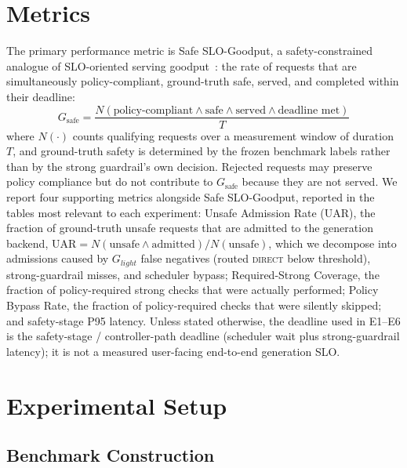 \documentclass[conference]{IEEEtran}
\newcommand{\Glight}{G_{\mathit{light}}}
\newcommand{\Gsafe}{G_{\mathrm{safe}}}
\newcommand{\DIRECT}{\textsc{direct}}
\begin{document}
\section{Metrics}
\label{sec:metrics}

The primary performance metric is Safe SLO-Goodput, a safety-constrained analogue of SLO-oriented serving goodput~\cite{zhong2024distserve}: the rate of requests that are simultaneously policy-compliant, ground-truth safe, served, and completed within their deadline:
\begin{equation}
\Gsafe = \frac{N(\text{policy-compliant} \!\wedge\! \text{safe} \!\wedge\! \text{served} \!\wedge\! \text{deadline met})}{T}
\end{equation}
where $N(\cdot)$ counts qualifying requests over a measurement window of duration $T$, and ground-truth safety is determined by the frozen benchmark labels rather than by the strong guardrail's own decision. Rejected requests may preserve policy compliance but do not contribute to $\Gsafe$ because they are not served. We report four supporting metrics alongside Safe SLO-Goodput, reported in the tables most relevant to each experiment: Unsafe Admission Rate (UAR), the fraction of ground-truth unsafe requests that are admitted to the generation backend, $\mathrm{UAR} = N(\text{unsafe} \wedge \text{admitted}) / N(\text{unsafe})$, which we decompose into admissions caused by $\Glight$ false negatives (routed \DIRECT{} below threshold), strong-guardrail misses, and scheduler bypass; Required-Strong Coverage, the fraction of policy-required strong checks that were actually performed; Policy Bypass Rate, the fraction of policy-required checks that were silently skipped; and safety-stage P95 latency. Unless stated otherwise, the deadline used in E1--E6 is the safety-stage / controller-path deadline (scheduler wait plus strong-guardrail latency); it is not a measured user-facing end-to-end generation SLO.

\section{Experimental Setup}
\label{sec:setup}

\subsection{Benchmark Construction}
\end{document}
